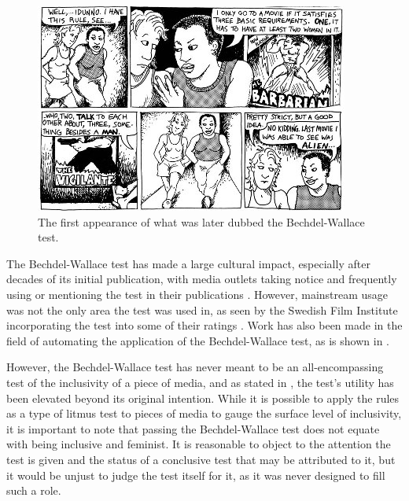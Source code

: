 \documentclass[a4paper, 11pt]{article}
\begin{document}
\begin{figure}[h!]
  \includegraphics[width=\linewidth]{figures/bechdel.jpg}
  \caption{The first appearance of what was later dubbed the Bechdel-Wallace test. \citep{bechdel}}
  \label{fig:bechdel}
\end{figure}

The Bechdel-Wallace test has made a large cultural impact, especially after decades of its initial publication, with media outlets taking notice and frequently using or mentioning the test in their publications \citep{pacificrim}. However, mainstream usage was not the only area the test was used in, as seen by the Swedish Film Institute incorporating the test into some of their ratings \citep{swedes}. Work has also been made in the field of automating the application of the Bechdel-Wallace test, as is shown in \citet{otherbechdelresearch}.

However, the Bechdel-Wallace test has never meant to be an all-encompassing test of the inclusivity of a piece of media, and as stated in \citet{zeisler}, the test's utility has been elevated beyond its original intention. While it is possible to apply the rules as a type of litmus test to pieces of media to gauge the surface level of inclusivity, it is important to note that passing the Bechdel-Wallace test does not equate with being inclusive and feminist. It is reasonable to object to the attention the test is given and the status of a conclusive test that may be attributed to it, but it would be unjust to judge the test itself for it, as it was never designed to fill such a role.
\end{document}
